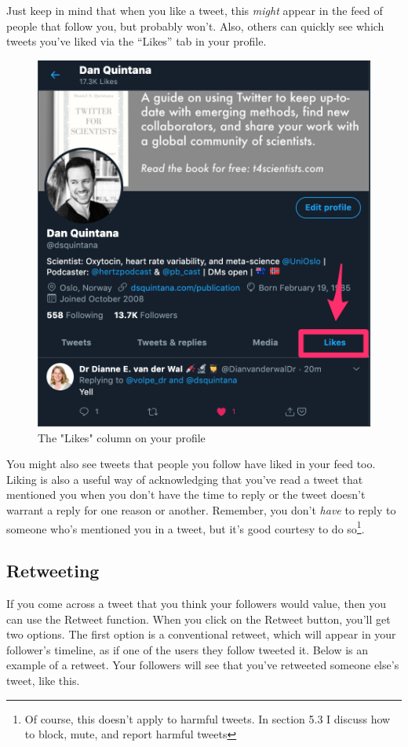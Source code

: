 \documentclass[
]{book}
\begin{document}
Just keep in mind that when you like a tweet, this \emph{might} appear in the feed of people that follow you, but probably won't. Also, others can quickly see which tweets you've liked via the ``Likes'' tab in your profile.

\begin{figure}

\includegraphics[width=0.8\linewidth]{images/likes} \hfill{}

\caption{The "Likes" column on your profile}\label{fig:unnamed-chunk-7}
\end{figure}

You might also see tweets that people you follow have liked in your feed too. Liking is also a useful way of acknowledging that you've read a tweet that mentioned you when you don't have the time to reply or the tweet doesn't warrant a reply for one reason or another. Remember, you don't \emph{have} to reply to someone who's mentioned you in a tweet, but it's good courtesy to do so\footnote{Of course, this doesn't apply to harmful tweets. In section 5.3 I discuss how to block, mute, and report harmful tweets}.

\hypertarget{retweeting}{%
\subsection{Retweeting}\label{retweeting}}

If you come across a tweet that you think your followers would value, then you can use the Retweet function. When you click on the Retweet button, you'll get two options. The first option is a conventional retweet, which will appear in your follower's timeline, as if one of the users they follow tweeted it. Below is an example of a retweet. Your followers will see that you've retweeted someone else's tweet, like this.
\end{document}
